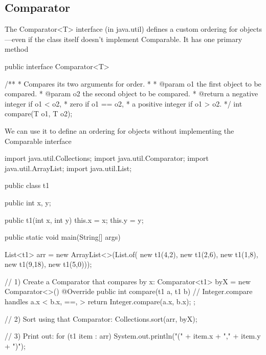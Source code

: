 \documentclass{report}
\begin{document}
    \subsection{Comparator}
    \bigbreak \noindent 
    The Comparator<T> interface (in java.util) defines a custom ordering for objects—even if the class itself doesn’t implement Comparable. It has one primary method
    \bigbreak \noindent 
    \begin{javacode}
        public interface Comparator<T> {
            /**
            * Compares its two arguments for order.
            *
            * @param o1 the first object to be compared.
            * @param o2 the second object to be compared.
            * @return a negative integer if o1 <  o2,
            *         zero                if o1 == o2,
            *         a positive integer if o1 >  o2.
            */
            int compare(T o1, T o2);

        }
    \end{javacode}
    \bigbreak \noindent 
    We can use it to define an ordering for objects without implementing the Comparable interface
    \bigbreak \noindent 
    \begin{javacode}
        import java.util.Collections;
        import java.util.Comparator;
        import java.util.ArrayList;
        import java.util.List;

        public class t1 {
            public int x, y;

            public t1(int x, int y) {
                this.x = x;
                this.y = y;
            }

            public static void main(String[] args) {
                List<t1> arr = new ArrayList<>(List.of( new t1(4,2), new t1(2,6), new t1(1,8), new t1(9,18), new t1(5,0)));

                // 1) Create a Comparator that compares by x:
                Comparator<t1> byX = new Comparator<>() {
                    @Override
                    public int compare(t1 a, t1 b) {
                        // Integer.compare handles a.x < b.x, ==, >
                        return Integer.compare(a.x, b.x);
                    }
                };

                // 2) Sort using that Comparator:
                Collections.sort(arr, byX);

                // 3) Print out:
                for (t1 item : arr) {
                    System.out.println("(" + item.x + "," + item.y + ")");
                }
            }
        }
    \end{javacode}
\end{document}
